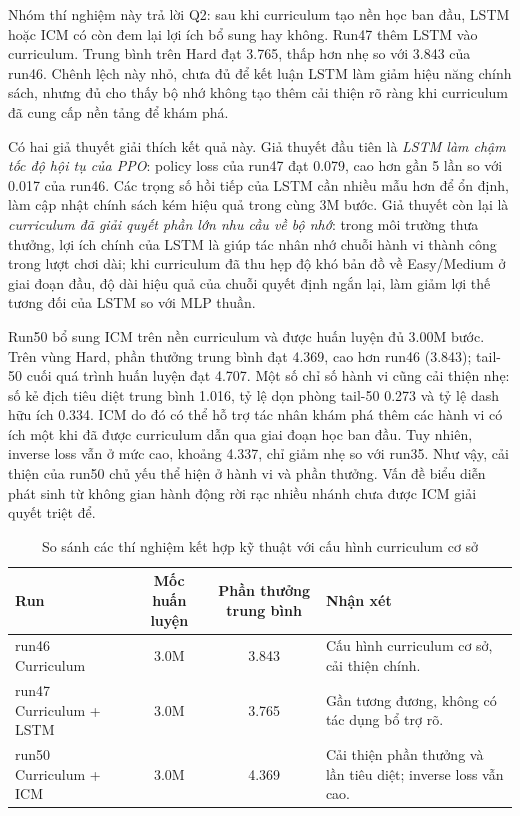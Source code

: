 Nhóm thí nghiệm này trả lời Q2: sau khi curriculum tạo nền học ban đầu, LSTM hoặc ICM có còn đem lại lợi ích bổ sung hay không. Run47 thêm LSTM vào curriculum. Trung bình trên Hard đạt 3.765, thấp hơn nhẹ so với 3.843 của run46. Chênh lệch này nhỏ, chưa đủ để kết luận LSTM làm giảm hiệu năng chính sách, nhưng đủ cho thấy bộ nhớ không tạo thêm cải thiện rõ ràng khi curriculum đã cung cấp nền tảng để khám phá.

Có hai giả thuyết giải thích kết quả này. Giả thuyết đầu tiên là \textit{LSTM làm chậm tốc độ hội tụ của PPO}: policy loss của run47 đạt 0.079, cao hơn gần 5 lần so với 0.017 của run46. Các trọng số hồi tiếp của LSTM cần nhiều mẫu hơn để ổn định, làm cập nhật chính sách kém hiệu quả trong cùng 3M bước. Giả thuyết còn lại là \textit{curriculum đã giải quyết phần lớn nhu cầu về bộ nhớ}: trong môi trường thưa thưởng, lợi ích chính của LSTM là giúp tác nhân nhớ chuỗi hành vi thành công trong lượt chơi dài; khi curriculum đã thu hẹp độ khó bản đồ về Easy/Medium ở giai đoạn đầu, độ dài hiệu quả của chuỗi quyết định ngắn lại, làm giảm lợi thế tương đối của LSTM so với MLP thuần.

Run50 bổ sung ICM trên nền curriculum và được huấn luyện đủ 3.00M bước. Trên vùng Hard, phần thưởng trung bình đạt 4.369, cao hơn run46 (3.843); tail-50 cuối quá trình huấn luyện đạt 4.707. Một số chỉ số hành vi cũng cải thiện nhẹ: số kẻ địch tiêu diệt trung bình 1.016, tỷ lệ dọn phòng tail-50 0.273 và tỷ lệ dash hữu ích 0.334. ICM do đó có thể hỗ trợ tác nhân khám phá thêm các hành vi có ích một khi đã được curriculum dẫn qua giai đoạn học ban đầu. Tuy nhiên, inverse loss vẫn ở mức cao, khoảng 4.337, chỉ giảm nhẹ so với run35. Như vậy, cải thiện của run50 chủ yếu thể hiện ở hành vi và phần thưởng. Vấn đề biểu diễn phát sinh từ không gian hành động rời rạc nhiều nhánh chưa được ICM giải quyết triệt để.

\begin{table}[H]
    \centering
    \small
    \caption{So sánh các thí nghiệm kết hợp kỹ thuật với cấu hình curriculum cơ sở}
    \label{tab:stacking_tests}
    \begin{tabular}{|p{3.5cm}|c|c|p{4.2cm}|}
        \hline
        \textbf{Run} & \textbf{Mốc huấn luyện} & \textbf{Phần thưởng trung bình} & \textbf{Nhận xét} \\
        \hline
        run46 Curriculum & 3.0M & 3.843 & Cấu hình curriculum cơ sở, cải thiện chính. \\
        \hline
        run47 Curriculum + LSTM & 3.0M & 3.765 & Gần tương đương, không có tác dụng bổ trợ rõ. \\
        \hline
        run50 Curriculum + ICM & 3.0M & 4.369 & Cải thiện phần thưởng và lần tiêu diệt; inverse loss vẫn cao. \\
        \hline
    \end{tabular}
\end{table}


